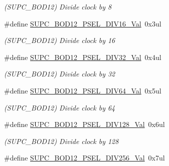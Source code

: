 \begin{DoxyCompactItemize}
\begin{DoxyCompactList}\small\item\em (S\+U\+P\+C\+\_\+\+B\+O\+D12) Divide clock by 8 \end{DoxyCompactList}\item 
\hypertarget{group___s_a_m_l21___s_u_p_c_ga0cc0b86ee2a7ef69953aa08d7160c381}{}\#define \hyperlink{group___s_a_m_l21___s_u_p_c_ga0cc0b86ee2a7ef69953aa08d7160c381}{S\+U\+P\+C\+\_\+\+B\+O\+D12\+\_\+\+P\+S\+E\+L\+\_\+\+D\+I\+V16\+\_\+\+Val}~0x3ul\label{group___s_a_m_l21___s_u_p_c_ga0cc0b86ee2a7ef69953aa08d7160c381}

\begin{DoxyCompactList}\small\item\em (S\+U\+P\+C\+\_\+\+B\+O\+D12) Divide clock by 16 \end{DoxyCompactList}\item 
\hypertarget{group___s_a_m_l21___s_u_p_c_ga0e1d6f1e15a1a72a8410f137af2b3bfe}{}\#define \hyperlink{group___s_a_m_l21___s_u_p_c_ga0e1d6f1e15a1a72a8410f137af2b3bfe}{S\+U\+P\+C\+\_\+\+B\+O\+D12\+\_\+\+P\+S\+E\+L\+\_\+\+D\+I\+V32\+\_\+\+Val}~0x4ul\label{group___s_a_m_l21___s_u_p_c_ga0e1d6f1e15a1a72a8410f137af2b3bfe}

\begin{DoxyCompactList}\small\item\em (S\+U\+P\+C\+\_\+\+B\+O\+D12) Divide clock by 32 \end{DoxyCompactList}\item 
\hypertarget{group___s_a_m_l21___s_u_p_c_gab257b93379a8513e52704da200df7d37}{}\#define \hyperlink{group___s_a_m_l21___s_u_p_c_gab257b93379a8513e52704da200df7d37}{S\+U\+P\+C\+\_\+\+B\+O\+D12\+\_\+\+P\+S\+E\+L\+\_\+\+D\+I\+V64\+\_\+\+Val}~0x5ul\label{group___s_a_m_l21___s_u_p_c_gab257b93379a8513e52704da200df7d37}

\begin{DoxyCompactList}\small\item\em (S\+U\+P\+C\+\_\+\+B\+O\+D12) Divide clock by 64 \end{DoxyCompactList}\item 
\hypertarget{group___s_a_m_l21___s_u_p_c_gaf069f29a7ff5c52ad68726c11adb77ab}{}\#define \hyperlink{group___s_a_m_l21___s_u_p_c_gaf069f29a7ff5c52ad68726c11adb77ab}{S\+U\+P\+C\+\_\+\+B\+O\+D12\+\_\+\+P\+S\+E\+L\+\_\+\+D\+I\+V128\+\_\+\+Val}~0x6ul\label{group___s_a_m_l21___s_u_p_c_gaf069f29a7ff5c52ad68726c11adb77ab}

\begin{DoxyCompactList}\small\item\em (S\+U\+P\+C\+\_\+\+B\+O\+D12) Divide clock by 128 \end{DoxyCompactList}\item 
\hypertarget{group___s_a_m_l21___s_u_p_c_ga06571dce79ef340d25d2f7025b605353}{}\#define \hyperlink{group___s_a_m_l21___s_u_p_c_ga06571dce79ef340d25d2f7025b605353}{S\+U\+P\+C\+\_\+\+B\+O\+D12\+\_\+\+P\+S\+E\+L\+\_\+\+D\+I\+V256\+\_\+\+Val}~0x7ul\label{group___s_a_m_l21___s_u_p_c_ga06571dce79ef340d25d2f7025b605353}


\end{DoxyCompactItemize}

